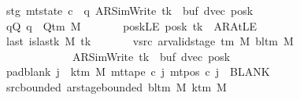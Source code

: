 \begin{isabellebody}
\ \ \ \ \ \ \ stg{\isacharcolon}{\kern0pt}\ {\isachardoublequoteopen}mt{\isacharunderscore}{\kern0pt}state\ c{\isacharprime}{\kern0pt}\ {\isacharequal}{\kern0pt}\ {\isacharparenleft}{\kern0pt}q{\isacharcomma}{\kern0pt}\ AR{\isacharunderscore}{\kern0pt}SimWrite{\isacharcomma}{\kern0pt}\ tk{\isacharcomma}{\kern0pt}\ {}{\isacharcomma}{\kern0pt}\ buf{\isacharcomma}{\kern0pt}\ dvec{\isacharcomma}{\kern0pt}\ posk{\isacharparenright}{\kern0pt}{\isachardoublequoteclose}\isanewline
\ \ \ \ \ \ \ qQ{\isacharcolon}{\kern0pt}\ {\isachardoublequoteopen}q\ {\isasymin}\ Q{\isacharunderscore}{\kern0pt}tm\ M{\isachardoublequoteclose}\isanewline
\ \ \ \ \ \ \ poskLE{\isacharcolon}{\kern0pt}\ {\isachardoublequoteopen}posk\ tk\ {\isacharequal}{\kern0pt}\ AR{\isacharunderscore}{\kern0pt}AtLE{\isachardoublequoteclose}\isanewline
\ \ \ \ \ \ \ last{\isacharcolon}{\kern0pt}\ {\isachardoublequoteopen}is{\isacharunderscore}{\kern0pt}last{\isacharunderscore}{\kern0pt}k\ M\ tk{\isachardoublequoteclose}\isanewline
\ \ \ \ \ \ \ vsrc{\isacharcolon}{\kern0pt}\ {\isachardoublequoteopen}ar{\isacharunderscore}{\kern0pt}valid{\isacharunderscore}{\kern0pt}stage\ {\isacharparenleft}{\kern0pt}{\isasymGamma}{\isacharunderscore}{\kern0pt}tm\ M{\isacharparenright}{\kern0pt}\ {\isacharparenleft}{\kern0pt}bl{\isacharunderscore}{\kern0pt}tm\ M{\isacharparenright}{\kern0pt}\isanewline
\ \ \ \ \ \ \ \ \ \ \ \ \ \ \ \ \ \ \ {\isacharparenleft}{\kern0pt}AR{\isacharunderscore}{\kern0pt}SimWrite{\isacharcomma}{\kern0pt}\ tk{\isacharcomma}{\kern0pt}\ {}{\isacharcomma}{\kern0pt}\ buf{\isacharcomma}{\kern0pt}\ dvec{\isacharcomma}{\kern0pt}\ posk{\isacharparenright}{\kern0pt}{\isachardoublequoteclose}\isanewline
\ \ \ \ \ \ \ pad{\isacharunderscore}{\kern0pt}blank{\isacharcolon}{\kern0pt}\ {\isachardoublequoteopen}{\isasymforall}j\ {\isasymge}\ k{\isacharunderscore}{\kern0pt}tm\ M{\isachardot}{\kern0pt}\ mt{\isacharunderscore}{\kern0pt}tape\ c{\isacharprime}{\kern0pt}\ j\ {\isacharparenleft}{\kern0pt}mt{\isacharunderscore}{\kern0pt}pos\ c{\isacharprime}{\kern0pt}\ j{\isacharparenright}{\kern0pt}\ {\isacharequal}{\kern0pt}\ BLANK{}{\isachardoublequoteclose}\isanewline
\ \ \ \ \ \ \ src{\isacharunderscore}{\kern0pt}bounded{\isacharcolon}{\kern0pt}\ {\isachardoublequoteopen}ar{\isacharunderscore}{\kern0pt}stage{\isacharunderscore}{\kern0pt}bounded\ {\isacharparenleft}{\kern0pt}bl{\isacharunderscore}{\kern0pt}tm\ M{\isacharparenright}{\kern0pt}\ {\isacharparenleft}{\kern0pt}k{\isacharunderscore}{\kern0pt}tm\ M{\isacharparenright}{\kern0pt}\isanewline

\end{isabellebody}
